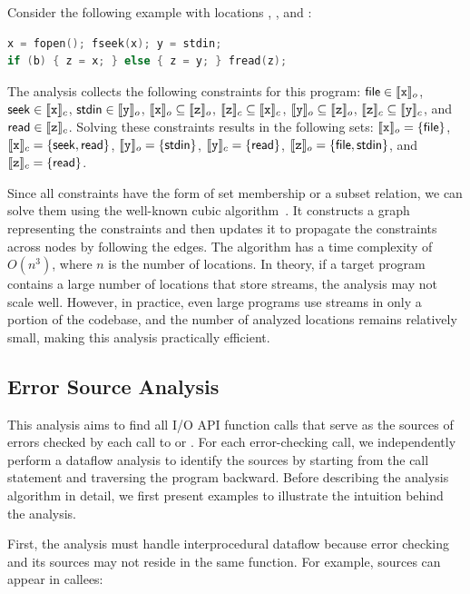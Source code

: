 Consider the following example with locations , , and :

\begin{lstlisting}[language=C]
x = fopen(); fseek(x); y = stdin;
if (b) { z = x; } else { z = y; } fread(z);
\end{lstlisting}

\noindent
%
The analysis collects the following constraints for this program:
%
${\sf file}\in\llbracket{\small\ensuremath{\tt x}}\rrbracket_o$,
%
${\sf seek}\in\llbracket{\small\ensuremath{\tt x}}\rrbracket_c$,
%
${\sf stdin}\in\llbracket{\small\ensuremath{\tt y}}\rrbracket_o$,
%
$\llbracket{\small\ensuremath{\tt x}}\rrbracket_o\subseteq\llbracket{\small\ensuremath{\tt z}}\rrbracket_o$,
%
$\llbracket{\small\ensuremath{\tt z}}\rrbracket_c\subseteq\llbracket{\small\ensuremath{\tt x}}\rrbracket_c$,
%
$\llbracket{\small\ensuremath{\tt y}}\rrbracket_o\subseteq\llbracket{\small\ensuremath{\tt z}}\rrbracket_o$,
%
$\llbracket{\small\ensuremath{\tt z}}\rrbracket_c\subseteq\llbracket{\small\ensuremath{\tt y}}\rrbracket_c$,
%
and ${\sf read}\in\llbracket{\small\ensuremath{\tt z}}\rrbracket_c$.
%
Solving these constraints results in the following sets:
%
$\llbracket{\small\ensuremath{\tt x}}\rrbracket_o=\{{\sf file}\}$, $\llbracket{\small\ensuremath{\tt x}}\rrbracket_c=\{{\sf seek},{\sf read}\}$,
%
$\llbracket{\small\ensuremath{\tt y}}\rrbracket_o=\{{\sf stdin}\}$, $\llbracket{\small\ensuremath{\tt y}}\rrbracket_c=\{{\sf read}\}$,
%
$\llbracket{\small\ensuremath{\tt z}}\rrbracket_o=\{{\sf file},{\sf stdin}\}$, and $\llbracket{\small\ensuremath{\tt z}}\rrbracket_c=\{{\sf read}\}$.

Since all constraints have the form of set membership or a subset relation, we
can solve them using the well-known cubic algorithm~\cite{spa}.
%
It constructs a graph representing the constraints and then updates it to
propagate the constraints across nodes by following the edges.
%
The algorithm has a time complexity of $O(n^3)$, where $n$ is the number of
locations.
%
In theory, if a target program contains a large number of locations that store
streams, the analysis may not scale well.
%
However, in practice, even large programs use streams in only a portion of the
codebase, and the number of analyzed locations remains relatively small, making
this analysis practically efficient.

\subsection{Error Source Analysis}
\label{sec:analysis:error}

This analysis aims to find all I/O API function calls that serve as the sources
of errors checked by each call to  or .
%
For each error-checking call, we independently perform a dataflow analysis to
identify the sources by starting from the call statement and traversing the
program backward.
%
Before describing the analysis algorithm in detail, we first present examples to
illustrate the intuition behind the analysis.

First, the analysis must handle interprocedural dataflow because error checking
and its sources may not reside in the same function.
%
For example, sources can appear in callees:

